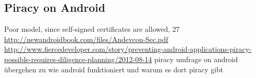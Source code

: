 \subsection{Piracy on Android}\label{subsection:piracy-android}
Poor model, since self-signed certificates are allowed, 27 \url{http://newandroidbook.com/files/Andevcon-Sec.pdf}\newline
\url{http://www.fiercedeveloper.com/story/preventing-android-applications-piracy-possible-requires-diligence-planning/2012-08-14} piracy umfrage on android\newline
übergehen zu wie android funktioniert und warum es dort piracy gibt\newline
